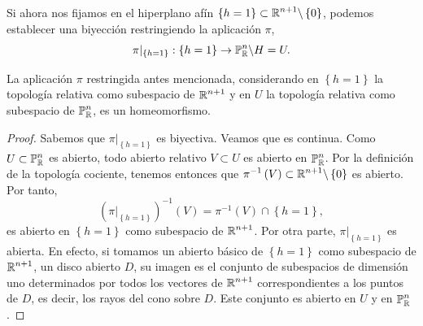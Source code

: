 Si ahora nos fijamos en el hiperplano afín $\displaystyle \left\{ h = 1\right\} \subset \mathbb{R}^{n+1} \backslash \left\{ 0\right\}  $, podemos establecer una biyección restringiendo la aplicación $\displaystyle \pi  $,
\[\pi |_{ \left\{ h = 1\right\} } : \left\{ h = 1\right\} \to \mathbb{P}^{n}_{\mathbb{R}} \backslash H = U .\]
\begin{prop}
	La aplicación $\displaystyle \pi  $ restringida antes mencionada, considerando en $\displaystyle \left\{ h =1\right\}  $ la topología relativa como subespacio de $\displaystyle \mathbb{R}^{n+1} $ y en $\displaystyle U $ la topología relativa como subespacio de $\displaystyle \mathbb{P}^{n}_{\mathbb{R}} $, es un homeomorfismo.
\end{prop}
\begin{proof}
	Sabemos que $\displaystyle \pi |_{ \left\{ h = 1\right\} } $ es biyectiva. Veamos que es continua. Como $\displaystyle U \subset \mathbb{P}^{n}_{\mathbb{R}} $ es abierto, todo abierto relativo $\displaystyle V \subset U $ es abierto en $\displaystyle \mathbb{P}^{n}_{\mathbb{R}} $. Por la definición de la topología cociente, tenemos entonces que $\displaystyle \pi ^{-1}\left(V\right)\subset \mathbb{R}^{n+1} \backslash \left\{ 0\right\}  $ es abierto. Por tanto, 
	\[ \left(\pi|_{ \left\{ h=1\right\} }\right)^{-1}\left(V\right) =\pi^{-1}\left(V\right)\cap \left\{ h = 1\right\}  ,\]
	es abierto en $\displaystyle \left\{ h=1\right\}  $ como subespacio de $\displaystyle \mathbb{R}^{n+1} $. Por otra parte, $\displaystyle \pi| _{ \left\{ h = 1\right\} } $ es abierta. En efecto, si tomamos un abierto básico de $\displaystyle \left\{ h = 1\right\}  $ como subespacio de $\displaystyle \mathbb{R}^{n+1} $, un disco abierto $\displaystyle D $, su imagen es el conjunto de subespacios de dimensión uno determinados por todos los vectores de $\displaystyle \mathbb{R}^{n+1} $ correspondientes a los puntos de $\displaystyle D $, es decir, los rayos del cono sobre $\displaystyle D $. Este conjunto es abierto en $\displaystyle U $ y en $\displaystyle \mathbb{P}^{n}_{\mathbb{R}} $. 
\end{proof}

